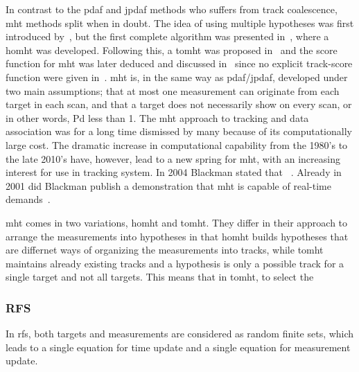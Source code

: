 In contrast to the \gls{pdaf} and \gls{jpdaf} methods who suffers from track coalescence, \gls{mht} methods split when in doubt. The idea of using multiple hypotheses was first introduced by~\cite{Singer1974}, but the first complete algorithm was presented in~\cite{Reid1979}, where a \gls{homht} was developed. Following this, a \gls{tomht} was proposed in~\cite{Kurien1990} and the \gls{score} function for \gls{mht} was later deduced and discussed in~\cite{Bar-Shalom2007} since no explicit track-score function were given in~\cite{Kurien1990}. \gls{mht} is, in the same way as \gls{pdaf}/\gls{jpdaf}, developed under two main assumptions; that at most one \gls{measurement} can originate from each \gls{target} in each scan, and that a \gls{target} does not necessarily show on every scan, or in other words, \gls{Pd} less than 1. The \gls{mht} approach to tracking and data association was for a long time dismissed by many because of its computationally large cost. The dramatic increase in computational capability from the 1980's to the late 2010's have, however, lead to a new spring for \gls{mht}, with an increasing interest for use in tracking system. In 2004 Blackman stated that ~\cite{Blackman2004}. Already in 2001 did Blackman publish a demonstration that \gls{mht} is capable of real-time demands~\cite{Blackman2001}.

\gls{mht} comes in two variations, \gls{homht} and \gls{tomht}. They differ in their approach to arrange the measurements into hypotheses in that \gls{homht} builds hypotheses that are differnet ways of organizing the measurements into tracks, while \gls{tomht} maintains already existing tracks and a hypothesis is only a possible track for a single target and not all targets. This means that in \gls{tomht}, to select the 


\subsubsection{RFS}
In \gls{rfs}, both targets and measurements are considered as random finite sets, which leads to a single equation for time update and a single equation for measurement update.